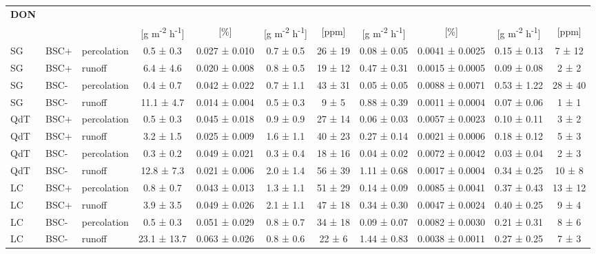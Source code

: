 \begin{table}
{\begin{tabular}{lllcccccccc}
{\small\textbf{DON}} \\ 
\cmidrule(lr){4-4} \cmidrule(lr){5-5} \cmidrule(lr){6-6} \cmidrule(lr){7-7} \cmidrule(lr){8-8} \cmidrule(lr){9-9} \cmidrule(lr){10-10} \cmidrule(lr){11-11}
 & 
 & 
 & 
{\small{[g m\textsuperscript{-2} h\textsuperscript{-1}]}} & 
{\small{[\%]}} & 
{\small{[g m\textsuperscript{-2} h\textsuperscript{-1}]}} & 
{\small{[ppm]}} & 
{\small{[g m\textsuperscript{-2} h\textsuperscript{-1}]}} & 
{\small{[\%]}} & 
{\small{[g m\textsuperscript{-2} h\textsuperscript{-1}]}} & 
{\small{[ppm]}} \\ 
\hline
SG  & BSC+ & percolation & 0.5 ± 0.3  & 0.027 ± 0.010 & 0.7 ± 0.5   & 26 ± 19   & 0.08 ± 0.05  & 0.0041 ± 0.0025 & 0.15 ± 0.13 & 7 ± 12  \\
SG  & BSC+ & runoff      & 6.4 ± 4.6  & 0.020 ± 0.008 & 0.8 ± 0.5   & 19 ± 12   & 0.47 ± 0.31  & 0.0015 ± 0.0005 & 0.09 ± 0.08 & 2 ± 2   \\
SG  & BSC- & percolation & 0.4 ± 0.7  & 0.042 ± 0.022 & 0.7 ± 1.1   & 43 ± 31   & 0.05 ± 0.05  & 0.0088 ± 0.0071 & 0.53 ± 1.22 & 28 ± 40 \\
SG  & BSC- & runoff      & 11.1 ± 4.7 & 0.014 ± 0.004 & 0.5 ± 0.3   & 9 ± 5     & 0.88 ± 0.39  & 0.0011 ± 0.0004 & 0.07 ± 0.06 & 1 ± 1   \\
QdT & BSC+ & percolation & 0.5 ± 0.3  & 0.045 ± 0.018 & 0.9 ± 0.9   & 27 ± 14   & 0.06 ± 0.03  & 0.0057 ± 0.0023 & 0.10 ± 0.11 & 3 ± 2   \\
QdT & BSC+ & runoff      & 3.2 ± 1.5  & 0.025 ± 0.009 & 1.6 ± 1.1   & 40 ± 23   & 0.27 ± 0.14  & 0.0021 ± 0.0006 & 0.18 ± 0.12 & 5 ± 3   \\
QdT & BSC- & percolation & 0.3 ± 0.2  & 0.049 ± 0.021 & 0.3 ± 0.4   & 18 ± 16   & 0.04 ± 0.02  & 0.0072 ± 0.0042 & 0.03 ± 0.04 & 2 ± 3   \\
QdT & BSC- & runoff      & 12.8 ± 7.3 & 0.021 ± 0.006 & 2.0 ± 1.4   & 56 ± 39   & 1.11 ± 0.68  & 0.0017 ± 0.0004 & 0.34 ± 0.25 & 10 ± 8  \\
LC  & BSC+ & percolation & 0.8 ± 0.7  & 0.043 ± 0.013 & 1.3 ± 1.1   & 51 ± 29   & 0.14 ± 0.09  & 0.0085 ± 0.0041 & 0.37 ± 0.43 & 13 ± 12 \\
LC  & BSC+ & runoff      & 3.9 ± 3.5  & 0.049 ± 0.026 & 2.1 ± 1.1   & 47 ± 18   & 0.34 ± 0.30  & 0.0047 ± 0.0024 & 0.40 ± 0.25 & 9 ± 4   \\
LC  & BSC- & percolation & 0.5 ± 0.3  & 0.051 ± 0.029 & 0.8 ± 0.7   & 34 ± 18   & 0.09 ± 0.07  & 0.0082 ± 0.0030 & 0.21 ± 0.31 & 8 ± 6   \\
LC  & BSC- & runoff      & 23.1 ± 13.7& 0.063 ± 0.026 & 0.8 ± 0.6   & 22 ± 6    & 1.44 ± 0.83  & 0.0038 ± 0.0011 & 0.27 ± 0.25 & 7 ± 3   \\

\end{tabular}}
\end{table}
